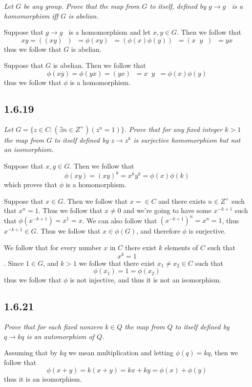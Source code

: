 \documentclass[11pt,oneside,titlepage]{book}
\DeclareMathOperator \inv {^{-1}}
\begin{document}
\textit{Let $G$ be any group. Prove that the map from $G$ to itself, defined by $g \to g \inv$
  is a homomorphism iff $G$ is abelian.}

Suppose that $g \to g \inv$ is a homomorphism and let $x, y \in G$. Then we follow that
$$xy = ((xy)\inv) \inv = \phi(xy) \inv = (\phi(x) \phi(y))\inv = (x\inv y\inv )\inv = yx$$
thus we follow that $G$ is abelian.

Suppose that $G$ is abelian. Then we follow that 
$$\phi(xy) = \phi(yx) = (yx)\inv = x\inv y\inv = \phi(x) \phi(y)$$
thus we follow that $\phi$ is a homomorphism.

\subsection*{1.6.19}

\textit{Let $G = \{z \in C: (\exists n \in Z^+)(z^n = 1)\}$. Prove that for any
  fixed integer $k > 1$ the map from $G$ to itself defined by $z \to z^k$ is
  surjective homomorphism but not an isomorphism.}

Suppose that $x, y \in G$. Then we follow that
$$\phi(xy) = (xy)^k = x^ky^k = \phi(x) \phi(k)$$
which proves that $\phi$ is a homomorphism.

Suppose that $x \in G$. Then we follow that $x = \in C$ and there exists $n \in Z^+$ such that
$x^n = 1$. Thus we follow that $x \neq 0$ and we're going to have some $x^{-k + 1}$ such that
$\phi(x^{-k + 1}) = x^1 = x$.
We can also follow that $(x^{-k + 1})^n = x^n = 1$, thus $x^{-k + 1} \in G$. Thus we follow that
$x \in \phi(G)$, and therefore $\phi$ is surjective.

We follow that for every number $x$ in $C$ there exist $k$ elements of $C$ such that $$x^k = 1$$.
Since $1 \in G$, and $k > 1$ we follow that there exist $x_1 \neq x_2 \in C$ such that 
$$\phi(x_1) = 1 = \phi(x_2)$$
thus we follow that $\phi$ is not injective, and thus it is not an isomorphism.

\subsection*{1.6.21}

\textit{Prove that for each fixed nonzero $k \in Q$ the map from $Q$ to itself defined by
  $q \to kq$ is an automorphism of $Q$.}

Assuming that by $kq$ we mean multiplication and letting $\phi(q) = kq$, then we follow that
$$\phi(x + y) = k(x + y) = kx + ky = \phi(x) + \phi(y)$$
thus it is an isomorphism.
\end{document}
